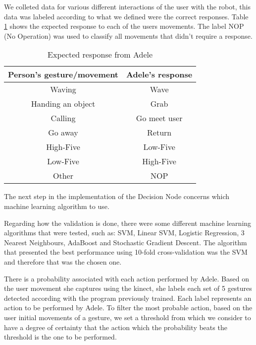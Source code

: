 We colleted data for various different interactions of the user with the robot, this data was labeled according to what we defined were the correct responses. Table \ref{tab:expected_response} shows the expected response to each of the users movements. The label NOP (No Operation) was used to classify all movements that didn't require a response.

\begin{table}[!h]
\centering
\caption{Expected response from Adele}
\label{tab:expected_response}
\begin{tabular}{|c|c|}
\hline
\textbf{Person's gesture/movement} & \textbf{Adele's response} \\ \hline
Waving                           & Wave                                 \\
Handing an object                & Grab                            		\\
Calling                          & Go meet user                         \\
Go away                          & Return                       \\
High-Five                        & Low-Five                             \\
Low-Five                         & High-Five                            \\
Other	                           & NOP                                  \\ \hline
\end{tabular}
\end{table}

The next step in the implementation of the Decision Node concerns which machine learning algorithm to use. 

Regarding how the validation is done, there were some different machine learning algorithms that were tested, such as: SVM, Linear SVM, Logistic Regression, 3 Nearest Neighbours, AdaBoost and Stochastic Gradient Descent. The algorithm that presented the best performance using 10-fold cross-validation was the SVM and therefore that was the chosen one.

There is a probability associated with each action performed by Adele. Based on the user movement she captures using the kinect, she labels each set of 5 gestures detected according with the program previously trained. Each label represents an action to be performed by Adele. To filter the most probable action, based on the user initial movements of a gesture, we set a threshold from which we consider to have a degree of certainty that the action which the probability beats the threshold is the one to be performed. 

